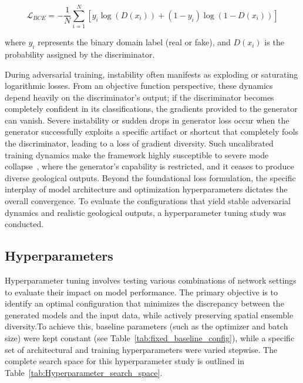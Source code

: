 \begin{equation}
    \mathcal{L}_{BCE} = - \frac{1}{N} \sum_{i=1}^N \left[ y_i \log(D(x_i)) + (1 - y_i) \log(1 - D(x_i)) \right]
\end{equation}

where $y_i$ represents the binary domain label (real or fake), and $D(x_i)$ is the probability assigned by the discriminator. 

During adversarial training, instability often manifests as exploding or saturating logarithmic losses. From an objective function perspective, these dynamics depend heavily on the discriminator's output; if the discriminator becomes completely confident in its classifications, the gradients provided to the generator can vanish. Severe instability or sudden drops in generator loss occur when the generator successfully exploits a specific artifact or shortcut that completely fools the discriminator, leading to a loss of gradient diversity. Such uncalibrated training dynamics make the framework highly susceptible to severe mode collapse~\parencite{prince2023understanding}, where the generator's capability is restricted, and it ceases to produce diverse geological outputs. Beyond the foundational loss formulation, the specific interplay of model architecture and optimization hyperparameters dictates the overall convergence. To evaluate the configurations that yield stable adversarial dynamics and realistic geological outputs, a hyperparameter tuning study was conducted.

\subsection{Hyperparameters}
Hyperparameter tuning involves testing various combinations of network settings to evaluate their impact on model performance. The primary objective is to identify an optimal configuration that minimizes the discrepancy between the generated models and the input data, while actively preserving spatial ensemble diversity.To achieve this, baseline parameters (such as the optimizer and batch size) were kept constant (see Table~\ref{tab:fixed_baseline_config}), while a specific set of architectural and training hyperparameters were varied stepwise. The complete search space for this hyperparameter study is outlined in Table~\ref{tab:Hyperparameter_search_space}.

